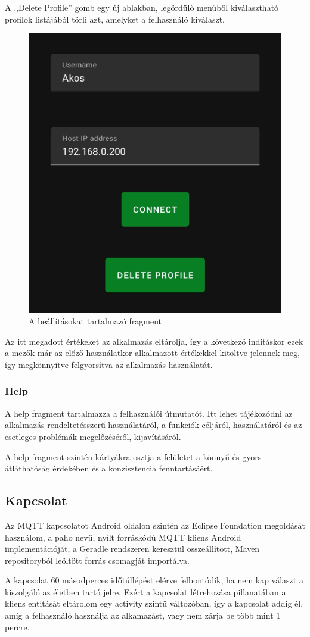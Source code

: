 \documentclass[
]{thesis-ekf}
\theoremstyle{definition}
\theoremstyle{remark}
\begin{document}
A ,,Delete Profile'' gomb egy új ablakban, legördülő menüből kiválasztható profilok listájából törli azt, amelyket a
felhasználó kiválaszt.
\begin{figure}[H]
	\centering
	\includegraphics[width=0.5\linewidth]{images/connect.jpg}
	\caption{A beállításokat tartalmazó fragment}
\end{figure}

Az itt megadott értékeket az alkalmazás eltárolja, így a következő indításkor ezek a mezők már az előző használatkor
alkalmazott értékekkel kitöltve jelennek meg, így megkönnyítve felgyorsítva az alkalmazás használatát.

\subsubsection{Help}
A help fragment tartalmazza a felhasználói útmutatót. Itt lehet tájékozódni az alkalmazás rendeltetésszerű használatáról,
a funkciók céljáról, használatáról és az esetleges problémák megelőzéséről, kijavításáról.

A help fragment szintén kártyákra osztja a felületet a könnyű és gyors átláthatóság érdekében és a
konzisztencia fenntartásáért.

\subsection{Kapcsolat}
Az MQTT kapcsolatot Android oldalon szintén az Eclipse Foundation megoldását használom, a paho\cite{paho} nevű,
nyílt forráskódú MQTT kliens Android implementációját, a Geradle rendszeren keresztül összeállított,
Maven repositoryból leöltött forrás csomagját importálva.

A kapcsolat 60 másodperces időtúllépést elérve felbontódik, ha nem kap választ a kiszolgáló az életben tartó
jelre. Ezért a kapcsolat létrehozása pillanatában a kliens entitását eltárolom egy activity szintű változóban,
így a kapcsolat addig él, amíg a felhasználó használja az alkamazást, vagy nem zárja be több mint 1 percre.
\end{document}
